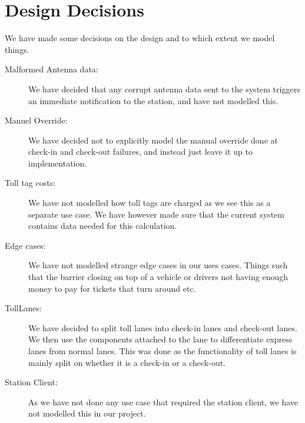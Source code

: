 \section{Design Decisions} 
\madeby{\kj}{\jb} We have made some decisions on the design and to which extent we model things.
\begin{description}
\item [Malformed Antenna data:] We have decided that any corrupt antenna data sent to the system triggers an immediate notification to the station, and have not modelled this.

\item [Manuel Override:] We have decided not to explicitly model the manual override done at check-in and check-out failures, and instead just leave it up to implementation.

\item [Toll tag costs:] We have not modelled how toll tags are charged as we see this as a separate use case. We have however made sure that the current system contains data needed for this calculation.

\item [Edge cases:] We have not modelled strange edge cases in our uses cases. Things such that the barrier closing on top of a vehicle or drivers not having enough money to pay for tickets that turn around etc.

\item [TollLanes:] We have decided to split toll lanes into check-in lanes and check-out lanes. We then use the components attached to the lane to differentiate express lanes from normal lanes. This was done as the functionality of toll lanes is mainly split on whether it is a check-in or a check-out.

\item [Station Client:] As we have not done any use case that required the station client, we have not modelled this in our project.


\end{description}


